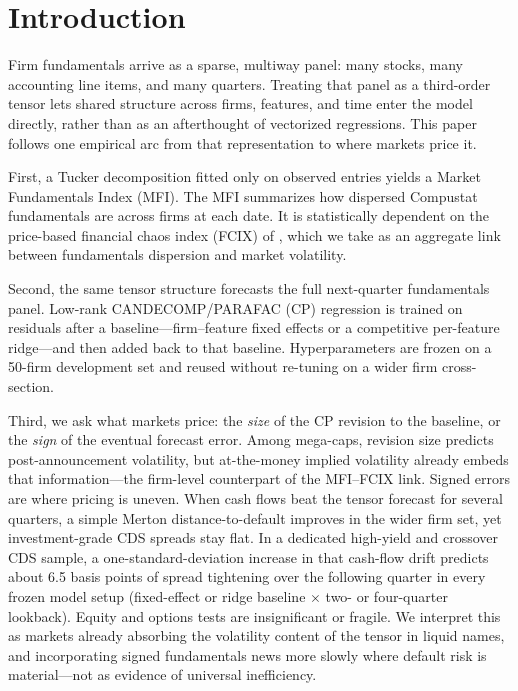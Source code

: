 \documentclass[pdflatex,sn-mathphys-num]{sn-jnl}%
\theoremstyle{thmstyleone}%
\theoremstyle{thmstyletwo}%
\theoremstyle{thmstylethree}%
\begin{document}
\maketitle





\section{Introduction}

Firm fundamentals arrive as a sparse, multiway panel: many stocks, many accounting line items, and many quarters. Treating that panel as a third-order tensor lets shared structure across firms, features, and time enter the model directly, rather than as an afterthought of vectorized regressions. This paper follows one empirical arc from that representation to where markets price it.

First, a Tucker decomposition fitted only on observed entries yields a Market Fundamentals Index (MFI). The MFI summarizes how dispersed Compustat fundamentals are across firms at each date. It is statistically dependent on the price-based financial chaos index (FCIX) of \citep{ataei2021theory}, which we take as an aggregate link between fundamentals dispersion and market volatility.

Second, the same tensor structure forecasts the full next-quarter fundamentals panel. Low-rank CANDECOMP/PARAFAC (CP) regression is trained on residuals after a baseline---firm--feature fixed effects or a competitive per-feature ridge---and then added back to that baseline. Hyperparameters are frozen on a 50-firm development set and reused without re-tuning on a wider firm cross-section.

Third, we ask what markets price: the \emph{size} of the CP revision to the baseline, or the \emph{sign} of the eventual forecast error. Among mega-caps, revision size predicts post-announcement volatility, but at-the-money implied volatility already embeds that information---the firm-level counterpart of the MFI--FCIX link. Signed errors are where pricing is uneven. When cash flows beat the tensor forecast for several quarters, a simple Merton distance-to-default improves in the wider firm set, yet investment-grade CDS spreads stay flat. In a dedicated high-yield and crossover CDS sample, a one-standard-deviation increase in that cash-flow drift predicts about 6.5 basis points of spread tightening over the following quarter in every frozen model setup (fixed-effect or ridge baseline $\times$ two- or four-quarter lookback). Equity and options tests are insignificant or fragile. We interpret this as markets already absorbing the volatility content of the tensor in liquid names, and incorporating signed fundamentals news more slowly where default risk is material---not as evidence of universal inefficiency.
\end{document}
